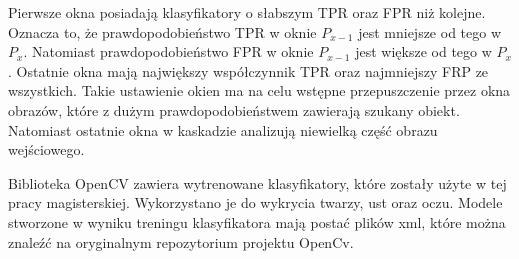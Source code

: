 \documentclass[a4paper,twoside,12pt]{book}
\begin{document}
    Pierwsze okna posiadają klasyfikatory o słabszym TPR oraz FPR niż kolejne.
    Oznacza to, że prawdopodobieństwo TPR w oknie $P_{x-1}$ jest mniejsze od tego w $P_{x}$.
    Natomiast prawdopodobieństwo FPR w oknie $P_{x-1}$ jest większe od tego w $P_{x}$.
    Ostatnie okna mają największy współczynnik TPR oraz najmniejszy FRP ze wszystkich.
    Takie ustawienie okien ma na celu wstępne przepuszczenie przez okna obrazów,
    które z dużym prawdopodobieństwem zawierają szukany obiekt.
    Natomiast ostatnie okna w kaskadzie analizują niewielką część obrazu wejściowego.

    Biblioteka OpenCV zawiera wytrenowane klasyfikatory, które zostały użyte w tej pracy magisterskiej.
    Wykorzystano
    je do wykrycia twarzy, ust oraz oczu.
    Modele stworzone w wyniku treningu klasyfikatora mają postać plików xml, które można znaleźć na oryginalnym
    repozytorium projektu OpenCv.

\end{document}
